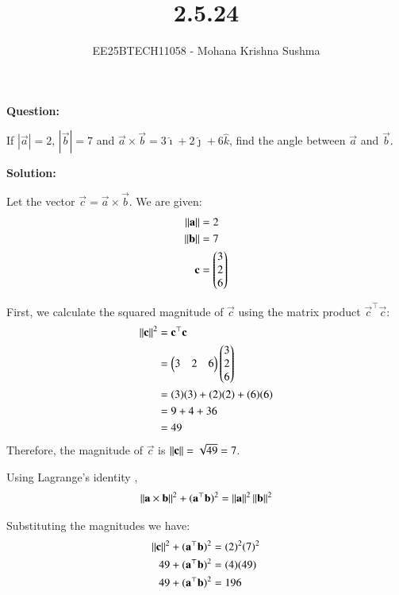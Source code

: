\documentclass[journal,12pt,onecolumn]{IEEEtran}
\theoremstyle{remark}
\begin{document}

\vspace{3cm}

\title{2.5.24}
\author{EE25BTECH11058 - Mohana Krishna Sushma}
\maketitle

\renewcommand{\thefigure}{\theenumi}
\renewcommand{\thetable}{\theenumi}

\textbf{Question:}\par
If $|\vec{a}| = 2$, $|\vec{b}| = 7$ and $\vec{a} \times \vec{b} = 3\hat{\imath}
+ 2\hat{\jmath} + 6\hat{k}$, find the angle between $\vec{a}$ and $\vec{b}$.
\par

\textbf{Solution:}\par

Let the vector $\vec{c} = \vec{a} \times \vec{b}$. We are given:
\begin{align}
    \left\lVert\mathbf{a}\right\rVert &= 2 \\
    \left\lVert\mathbf{b}\right\rVert &= 7 \\
    \mathbf{c} &= \begin{pmatrix}3 \\ 2 \\ 6\end{pmatrix}
\end{align}

First, we calculate the squared magnitude of $\vec{c}$ using the matrix product $\vec{c}^\top\vec{c}$:
\begin{align}
    \left\lVert\mathbf{c}\right\rVert^2 &= \mathbf{c}^\top\mathbf{c} \\
    &= \begin{pmatrix}3 & 2 & 6\end{pmatrix} \begin{pmatrix}3 \\ 2 \\ 6\end{pmatrix} \\
    &= (3)(3) + (2)(2) + (6)(6) \\
    &= 9 + 4 + 36 \\
    &= 49
\end{align}
\hspace{1cm}Therefore, the magnitude of $\vec{c}$ is $\left\lVert\mathbf{c}\right\rVert = \sqrt{49} = 7$.

Using Lagrange's identity , 
\begin{align}
    \left\lVert\mathbf{a} \times \mathbf{b}\right\rVert^2 + (\mathbf{a}^\top\mathbf{b})^2 = \left\lVert\mathbf{a}\right\rVert^2\left\lVert\mathbf{b}\right\rVert^2
\end{align}

Substituting the magnitudes we have:
\begin{align}
    \left\lVert\mathbf{c}\right\rVert^2 + (\mathbf{a}^\top\mathbf{b})^2 &= (2)^2(7)^2 \\
    49 + (\mathbf{a}^\top\mathbf{b})^2 &= (4)(49) \\
    49 + (\mathbf{a}^\top\mathbf{b})^2 &= 196
\end{align}
\end{document}
